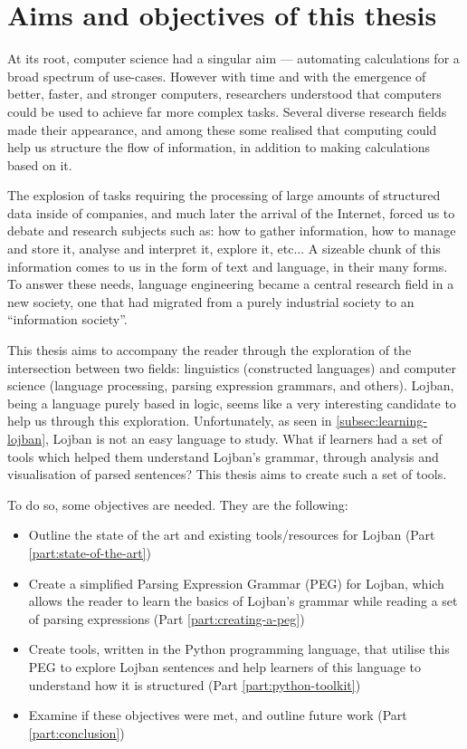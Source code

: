 \chapter{Aims and objectives of this thesis}

\vspace{0.5cm}

At its root, computer science had a singular aim --- automating calculations for a broad spectrum of use-cases.
However with time and with the emergence of better, faster, and stronger computers, researchers understood that computers could be used to achieve
far more complex tasks. Several diverse research fields made their appearance, and among these some realised that computing could help us structure the
flow of information, in addition to making calculations based on it. \newline

The explosion of tasks requiring the processing of large amounts of structured data inside of companies, and much later the arrival of the Internet,
forced us to debate and research subjects such as: how to gather information, how to manage and store it, analyse and interpret it, explore it, etc...
A sizeable chunk of this information comes to us in the form of text and language, in their many forms. To answer these needs, language engineering became a
central research field in a new society, one that had migrated from a purely industrial society to an ``information society''.\newline

This thesis aims to accompany the reader through the exploration of the intersection between two fields: linguistics (constructed languages)
and computer science (language processing, parsing expression grammars, and others). Lojban, being a language purely based in logic, seems like a very
interesting candidate to help us through this exploration. Unfortunately, as seen in \ref{subsec:learning-lojban}, Lojban is not an easy language to study.
What if learners had a set of tools which helped them understand Lojban's grammar, through analysis and visualisation of parsed sentences?
This thesis aims to create such a set of tools.\newline

\newpage

To do so, some objectives are needed. They are the following:
\begin{itemize}
\item Outline the state of the art and existing tools/resources for Lojban (Part \ref{part:state-of-the-art})
\item Create a simplified Parsing Expression Grammar (PEG) for Lojban, which allows the reader to learn the basics of Lojban's grammar
while reading a set of parsing expressions (Part \ref{part:creating-a-peg})
\item Create tools, written in the Python programming language, that utilise this PEG to explore Lojban sentences and help learners of this
language to understand how it is structured (Part \ref{part:python-toolkit})
\item Examine if these objectives were met, and outline future work (Part \ref{part:conclusion})
\end{itemize}
